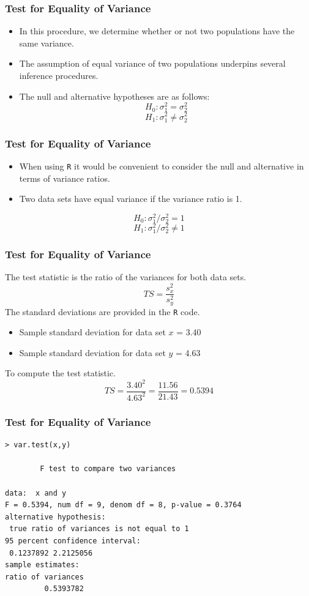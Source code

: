 \documentclass[a4]{beamer}
\begin{document}
\begin{frame}

\frametitle{Test for Equality of Variance}
\begin{itemize}
\item In this procedure, we determine whether or not two populations have the same variance.
\item The assumption of equal variance of two populations underpins several inference procedures. 
\ %
\item The null and alternative hypotheses are as follows:
\[ H_0: \sigma^2_1 = \sigma^2_2 \]
\[ H_1: \sigma^2_1 \neq \sigma^2_2 \]
\end{itemize}

\end{frame}
\begin{frame}
\frametitle{Test for Equality of Variance}
\begin{itemize}
\item When using \texttt{R} it would be convenient to consider the null and alternative in terms of variance ratios.
\item Two data sets have equal variance if the variance ratio is 1.
\end{itemize}

\[ H_0: \sigma^2_1 / \sigma^2_2 = 1 \]
\[ H_1: \sigma^2_1 / \sigma^2_2 \neq 1 \]
\end{frame}
\begin{frame}[fragile]
\frametitle{Test for Equality of Variance}
The test statistic is the ratio of the variances for both data sets.
\[ TS = \frac{s^2_x}{s^2_y} \]
The standard deviations are provided in the \texttt{R} code. \begin{itemize}
\item Sample standard deviation for data set $x$ = 3.40
\item Sample standard deviation for data set $y$ = 4.63
\end{itemize}
To compute the test statistic.
\[ TS = \frac{3.40^2}{4.63^2} = \frac{11.56}{21.43} = 0.5394 \]

\end{frame}
\begin{frame}[fragile]
\frametitle{Test for Equality of Variance}
\begin{verbatim}
> var.test(x,y)

        F test to compare two variances

data:  x and y
F = 0.5394, num df = 9, denom df = 8, p-value = 0.3764
alternative hypothesis: 
 true ratio of variances is not equal to 1
95 percent confidence interval:
 0.1237892 2.2125056
sample estimates:
ratio of variances
         0.5393782
\end{verbatim}

\end{frame}
\end{document}
